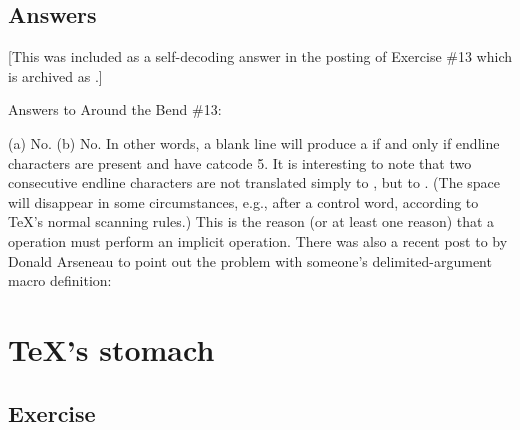 
\section{Answers}


[This was included as a self-decoding answer in the posting of Exercise
\#13 which is archived as .]


Answers to Around the Bend \#13:

(a) No. (b) No.  In other words, a blank line will produce a  if
and only if endline characters are present and have catcode 5. It is
interesting to note that two consecutive endline characters are not
translated simply to , but to .  (The space will
disappear in some circumstances, e.g., after a control word, according
to TeX's normal scanning rules.) This is the reason (or at least one
reason) that a  operation must perform an implicit \cmd{\unskip}
operation. There was also a recent post to  by Donald
Arseneau to point out the problem with someone's 
delimited-argument macro definition:



\chapter{TeX's stomach}

\section{Exercise}

\begin{comment}
Date: 26 Oct 1993 09:29:08 -0400 (EDT)
From: Michael Downes <MJD@MATH.AMS.ORG>
Subject: Around the Bend #14
To: info-tex@shsu.edu
X-ListName: TeX-Related Network Discussion List <INFO-TeX@SHSU.edu>
\end{comment}

